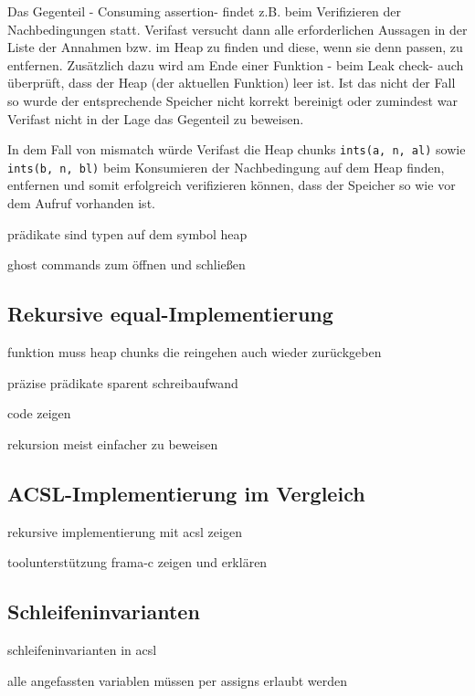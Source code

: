 Das Gegenteil - \glqq Consuming assertion\grqq - findet z.B. beim Verifizieren der Nachbedingungen statt.
Verifast versucht dann alle erforderlichen Aussagen in der Liste der Annahmen bzw. im Heap zu finden
und diese, wenn sie denn passen, zu entfernen. Zusätzlich dazu wird am Ende einer Funktion - beim 
\glqq Leak check\grqq - auch überprüft, dass der Heap (der aktuellen Funktion) leer ist. Ist das nicht 
der Fall so wurde der entsprechende Speicher nicht korrekt bereinigt oder zumindest war Verifast nicht 
in der Lage das Gegenteil zu beweisen.

In dem Fall von mismatch würde Verifast die Heap chunks \lstinline{ints(a, n, al)} sowie
\lstinline{ints(b, n, bl)} beim Konsumieren der Nachbedingung auf dem Heap finden, entfernen und
somit erfolgreich verifizieren können, dass der Speicher so wie vor dem Aufruf vorhanden ist.



prädikate sind typen auf dem symbol heap

ghost commands zum öffnen und schließen

\subsection{Rekursive equal-Implementierung}

funktion muss heap chunks die reingehen auch wieder zurückgeben



präzise prädikate sparent schreibaufwand

code zeigen

rekursion meist einfacher zu beweisen

\subsection{ACSL-Implementierung im Vergleich}

rekursive implementierung mit acsl zeigen

toolunterstützung frama-c zeigen und erklären

\subsection{Schleifeninvarianten}

schleifeninvarianten in acsl

alle angefassten variablen müssen per assigns erlaubt werden

